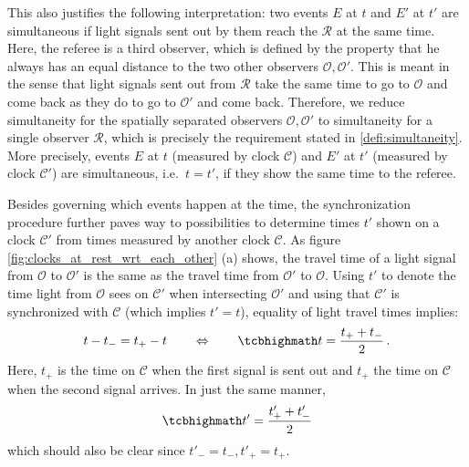 This also justifies the following interpretation: two events $E$ at $t$ and $E'$ at $t'$ are simultaneous if light signals sent out by them reach the  $\mathcal{R}$ at the same time. Here, the referee is a third observer, which is defined by the property that he always has an equal distance to the two other observers $\mathcal{O}, \mathcal{O}'$. This is meant in the sense that light signals sent out from $\mathcal{R}$ take the same time to go to $\mathcal{O}$ and come back as they do to go to $\mathcal{O}'$ and come back. Therefore, we reduce simultaneity for the spatially separated observers $\mathcal{O}, \mathcal{O}'$ to simultaneity for a single observer $\mathcal{R}$, which is precisely the requirement stated in \ref{defi:simultaneity}. More precisely, events $E$ at $t$ (measured by clock $\mathcal{C}$) and $E'$ at $t'$ (measured by clock $\mathcal{C}'$) are simultaneous, i.e.~$t = t'$, if they show the same time to the referee.


Besides governing which events happen at the time, the synchronization procedure further paves way to possibilities to determine times $t'$ shown on a clock $\mathcal{C}'$ from times measured by another clock $\mathcal{C}$. As figure \ref{fig:clocks_at_rest_wrt_each_other} (a) shows, the travel time of a light signal from $\mathcal{O}$ to $\mathcal{O}'$ is the same as the travel time from $\mathcal{O}'$ to $\mathcal{O}$. Using $t'$ to denote the time light from $\mathcal{O}$ sees on $\mathcal{C}'$ when intersecting $\mathcal{O}'$ and using that $\mathcal{C}'$ is synchronized with $\mathcal{C}$ (which implies $t' = t$), equality of light travel times implies:
\begin{equation}\label{eq:time_synchr}
	t - t_- = t_+ - t
	\qquad \Leftrightarrow \qquad
	\eqbox{
	t = \frac{t_+ + t_-}{2}
	} \, .
\end{equation}
Here, $t_+$ is the time on $\mathcal{C}$ when the first signal is sent out and $t_+$ the time on $\mathcal{C}$ when the second signal arrives. In just the same manner,
\begin{equation}\label{eq:time_synchr_primed}
	\eqbox{
	t' = \frac{t'_+ + t'_-}{2}
	}
\end{equation}
which should also be clear since $t'_- = t_-, t'_+ = t_+$.\\


